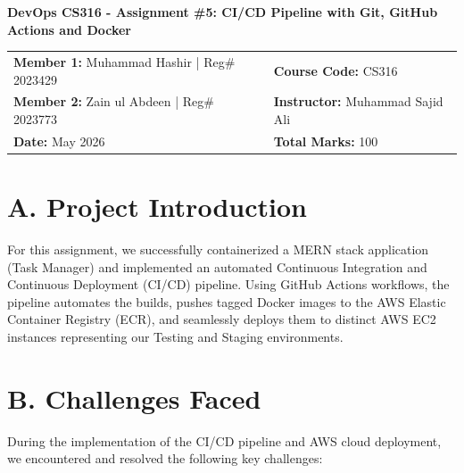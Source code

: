 \documentclass[12pt,letterpaper]{article}
\begin{document}
\begin{center}
    \Large\textbf{DevOps CS316 - Assignment \#5: CI/CD Pipeline with Git, GitHub Actions and Docker}
\end{center}

\vspace{0.5cm}

\begin{center}
    \begin{tabularx}{\textwidth}{@{}X X@{}}
        \textbf{Member 1:} Muhammad Hashir | Reg\# 2023429 & \textbf{Course Code:} CS316 \\
        \textbf{Member 2:} Zain ul Abdeen | Reg\# 2023773 & \textbf{Instructor:} Muhammad Sajid Ali \\
        \textbf{Date:} May 2026 & \textbf{Total Marks:} 100 \\
    \end{tabularx}
\end{center}

\vspace{1cm}

\section*{A. Project Introduction}
For this assignment, we successfully containerized a MERN stack application (Task Manager) and implemented an automated Continuous Integration and Continuous Deployment (CI/CD) pipeline. Using GitHub Actions workflows, the pipeline automates the builds, pushes tagged Docker images to the AWS Elastic Container Registry (ECR), and seamlessly deploys them to distinct AWS EC2 instances representing our Testing and Staging environments.

\section*{B. Challenges Faced}
During the implementation of the CI/CD pipeline and AWS cloud deployment, we encountered and resolved the following key challenges:
\end{document}
